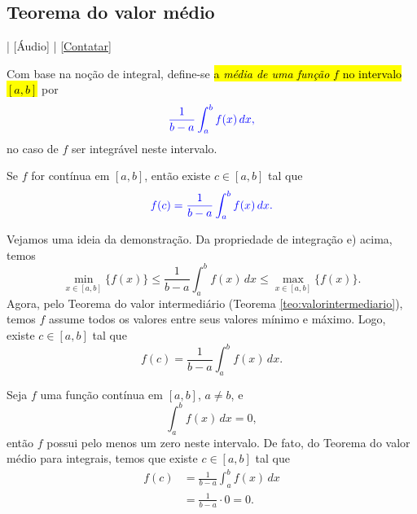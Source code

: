 \subsection{Teorema do valor médio}

\begin{flushright}
  [Vídeo] | [Áudio] | \href{https://phkonzen.github.io/notas/contato.html}{[Contatar]}
\end{flushright}

Com base na noção de integral, define-se \hl{a \emph{média de uma função} $f$ no intervalo $[a, b]$} por
\begin{equation}\color{blue}\frac{1}{b-a}\int_a^b f(x)\,dx,
\end{equation}
no caso de $f$ ser integrável neste intervalo.

\begin{teo}\label{teo:int_teomed}
  Se $f$ for contínua em $[a, b]$, então existe $c\in [a, b]$ tal que
  \begin{equation}\color{blue}f(c) = \frac{1}{b-a}\int_a^b f(x)\,dx.
  \end{equation}
\end{teo}
\begin{dem}
  Vejamos uma ideia da demonstração. Da propriedade de integração e) acima, temos
  \begin{equation}
    \min_{x\in [a, b]} \{f(x)\} \leq \frac{1}{b-a}\int_a^b f(x)\,dx \leq \max_{x\in [a, b]} \{f(x)\}.
  \end{equation}
  Agora, pelo Teorema do valor intermediário (Teorema \ref{teo:valorintermediario}), temos $f$ assume todos os valores entre seus valores mínimo e máximo. Logo, existe $c\in [a, b]$ tal que
  \begin{equation}
    f(c) = \frac{1}{b-a}\int_a^b f(x)\,dx.
  \end{equation}  
\end{dem}

\begin{ex}
  Seja $f$ uma função contínua em $[a, b]$, $a\neq b$, e
  \begin{equation}
    \int_a^b f(x)\,dx = 0,
  \end{equation}
  então $f$ possui pelo menos um zero neste intervalo. De fato, do Teorema do valor médio para integrais, temos que existe $c\in [a, b]$ tal que
  \begin{align}
    f(c) &= \frac{1}{b-a}\int_a^b f(x)\,dx\\
         &= \frac{1}{b-a}\cdot 0 = 0.
  \end{align}
\end{ex}

